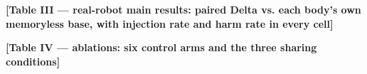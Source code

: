 \documentclass[letterpaper, 10 pt, conference]{ieeeconf}
\newcommand{\todo}[1]{\textbf{[#1]}}
\begin{document}
\todo{Table III --- real-robot main results: paired Delta vs. each body's own
memoryless base, with injection rate and harm rate in every cell}

\todo{Table IV --- ablations: six control arms and the three sharing conditions}
\end{document}
